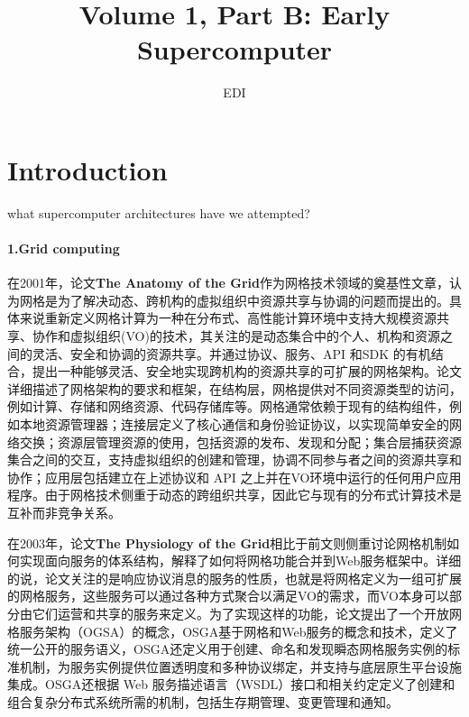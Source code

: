 \documentclass[a4paper,twoside]{scrbook}
\begin{document}
\title{Volume 1, Part B: Early Supercomputer}
\author{EDI}
\frontmatter
\maketitle
\tableofcontents
\mainmatter

\chapter{Introduction}

what supercomputer architectures have we attempted?

\subsubsection{1.Grid computing}
在2001年，论文\textbf{The Anatomy of the Grid}作为网格技术领域的奠基性文章，认为网格是为了解决动态、跨机构的虚拟组织中资源共享与协调的问题而提出的。具体来说重新定义网格计算为一种在分布式、高性能计算环境中支持大规模资源共享、协作和虚拟组织(VO)的技术，其关注的是动态集合中的个人、机构和资源之间的灵活、安全和协调的资源共享。并通过协议、服务、API 和SDK 的有机结合，提出一种能够灵活、安全地实现跨机构的资源共享的可扩展的网格架构。论文详细描述了网格架构的要求和框架，在结构层，网格提供对不同资源类型的访问，例如计算、存储和网络资源、代码存储库等。网格通常依赖于现有的结构组件，例如本地资源管理器；连接层定义了核心通信和身份验证协议，以实现简单安全的网络交换；资源层管理资源的使用，包括资源的发布、发现和分配；集合层捕获资源集合之间的交互，支持虚拟组织的创建和管理，协调不同参与者之间的资源共享和协作；应用层包括建立在上述协议和 API 之上并在VO环境中运行的任何用户应用程序。由于网格技术侧重于动态的跨组织共享，因此它与现有的分布式计算技术是互补而非竞争关系。

在2003年，论文\textbf{The Physiology of the Grid}相比于前文则侧重讨论网格机制如何实现面向服务的体系结构，解释了如何将网格功能合并到Web服务框架中。详细的说，论文关注的是响应协议消息的服务的性质，也就是将网格定义为一组可扩展的网格服务，这些服务可以通过各种方式聚合以满足VO的需求，而VO本身可以部分由它们运营和共享的服务来定义。为了实现这样的功能，论文提出了一个开放网格服务架构（OGSA）的概念，OSGA基于网格和Web服务的概念和技术，定义了统一公开的服务语义，OSGA还定义用于创建、命名和发现瞬态网格服务实例的标准机制，为服务实例提供位置透明度和多种协议绑定，并支持与底层原生平台设施集成。OSGA还根据 Web 服务描述语言（WSDL）接口和相关约定定义了创建和组合复杂分布式系统所需的机制，包括生存期管理、变更管理和通知。
\end{document}
